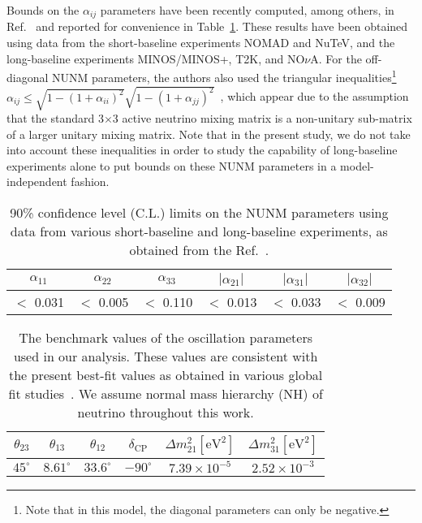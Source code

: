 \documentclass[11pt,a4paper]{article}
\newcommand{\capdef}{}
\newcommand{\mycaption}[2][\capdef]{\renewcommand{\capdef}{#2}
	\caption[#1]{{\footnotesize #2}}}
\begin{document}
Bounds on the $\alpha_{ij}$ parameters have been recently computed, among others, in Ref.~\cite{Forero:2021azc} and reported for convenience in Table~\ref{alphabounds1}. These results have been obtained using data from the short-baseline experiments NOMAD and NuTeV, and the long-baseline experiments MINOS/MINOS+, T2K, and NO$\nu$A. 
For the off-diagonal NUNM parameters, the authors also used the triangular inequalities\footnote{Note that in this model, the diagonal parameters can only be negative.} $\alpha_{ij}\leq \sqrt{1-(1+\alpha_{ii})^2}\sqrt{1-(1+\alpha_{jj})^2}$~\cite{Escrihuela:2016ube}, which appear due to the assumption that the standard 3$\times$3 active neutrino mixing matrix is a non-unitary sub-matrix of a larger unitary mixing matrix.
  Note that in the present study, we do not take into account these inequalities in order to study the capability of long-baseline experiments alone to put bounds on these NUNM parameters in a model-independent fashion.

 \begin{table}
 	\centering
 	\begin{tabular}{|c|c|c|c|c|c|}
 		\hline\hline
 		$\alpha_{11}$ & $\alpha_{22}$ & $\alpha_{33}$ & $|\alpha_{21}|$ & $|\alpha_{31}|$ & $|\alpha_{32}|$\\ 
 		\hline
 		$<$ 0.031 &  $<$ 0.005 & $<$ 0.110 & $<$ 0.013 & $<$ 0.033 & $<$ 0.009  \\
 			\hline\hline
 	\end{tabular}
 	\mycaption{\label{alphabounds1}90\% confidence level (C.L.) limits on the NUNM parameters using data from various short-baseline and long-baseline  experiments, as obtained from the Ref.~\cite{Forero:2021azc}.} 
 \end{table}
 
 
 \begin{table}
 	\centering
 	\begin{tabular}{|c|c|c|c|c|c|}
 		\hline\hline
 		$\theta_{23}$&$\theta_{13}$&$\theta_{12}$&$\delta_{\mathrm{CP}}$&$\Delta m^2_{21} [\mathrm{eV^2}]$&$\Delta m^2_{31} [\mathrm{eV^2}]$ \\
 		\hline
 		$45^{\circ}$ & $8.61^{\circ}$&$33.6^{\circ}$& $-90^{\circ}$ &$ 7.39\times 10^{-5}$&$2.52\times 10^{-3}$ \\
 		\hline\hline
 	\end{tabular}
 	\mycaption{The benchmark values of the oscillation parameters used in our analysis. These values are consistent with the present best-fit
 		values as obtained in various global fit 
 		studies~\cite{NuFIT,Esteban:2020cvm,deSalas:2020pgw,Capozzi:2021fjo}.
 		We assume normal mass hierarchy (NH) of neutrino throughout this work.}
 	\label{table:vac}
 \end{table}
 
\end{document}
